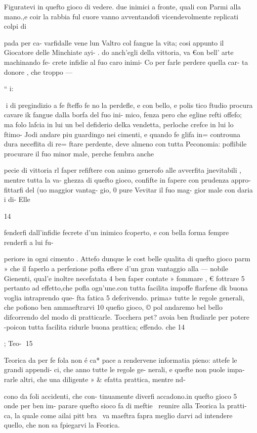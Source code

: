 {{Figuratevi in quefto gioco di
vedere. due inimici a fronte,
quali con Parmi alla mano.,e
coir la rabbia ful cuore vanno
avventandofi vicendevolmente
replicati colpi di {pada per ca-
varfidalle vene lun Valtro col
fangue la vita; cosi appunto il
Giocatore delle Minchiate ayi- .
do anch’egli della vittoria, va
€on bell’ arte machinando fe-
crete infidie al fuo caro inimi-
Co per farle perdere quella car-
ta donore , che troppo —

“ i:

 
i
di pregindizio a fe fteffo fe no
la perdefle, e con bello, e polis
tico ftudio procura cavare ik
fangue dalla borfa del fuo ini-
mico, fenza pero che egline
refti offefo; ma folo lafcia in lui
un bel defiderio delka vendetta,
perloche crefce in lui lo ftimo-
Jodi andare piu guardingo nei
cimenti, e quando fe glifa in=
controuna dura neceflita di re=
ftare perdente, deve almeno
con tutta Peconomia: poflibile
procurare il fuo minor male,
perche fembra anche {pecie di
vittoria rl faper refiftere con
animo generofo alle avverfita
jnevitabili , mentre tutta la va-
ghezza di quefto gioco, confifte
in fapere con prudenza appro-
fittarfi del (uo maggior vantag-
gio, 0 pure Vevitar il fuo mag-
gior male con daria i di-
Elle
 

 

14

fenderfi dall’infidie fecrete d'un
inimico fcoperto, e con bella
forma fempre renderfi a lui fu-

periore in ogni cimento .
Attefo dunque le cost belle
qualita di quefto gioco parm »
che il faperlo a perfezione pofla
eflere d’un gran vantaggio alla —
nobile Gienenti, qual’e inoltre
necefatata 4 ben faper contate »
fommare , € fottrare 5 pertanto
ad effetto,che pofla ogn’une.con
tutta facilita impoffe flarfene dk
buona voglia intraprendo que-
fta fatica 5 defcrivendo. prima»
tutte le regole generali, che
pofiono ben ammaeftrarvi 10
quefio gioco, © pol andaremo
bel bello difcorrendo del modo
di pratticarle. Tocchera pet?
avoia ben ftudiarle per potere
-poicon tutta facilita ridurle
buona prattica; effendo. che 14

; Teo-
15

Teorica da per fe fola non é ca*
pace a rendervene informatia
pieno: attefe le grandi appendi-
ci, che anno tutte le regole ge-
nerali, e quefte non puole impa-
rarle altri, che una diligente »
& efatta prattica, mentre nd-
{cono da foli accidenti, che con-
tinuamente diverfi accadono.in
quefto gioco 5 onde per ben im-
parare quefto sioco fa di meftie~
reunire alla Teorica la pratti-
ca, la quale come ailai pitt bra~
va maeftra fapra meglio darvi
ad intendere quello, che non sa
fpiegarvi la Feorica.

}}}}}
